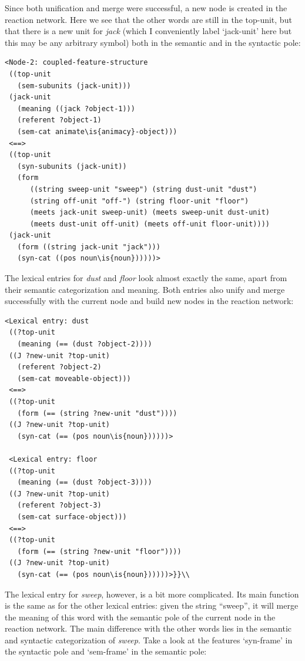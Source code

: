 Since both unification and merge were successful, a new node is created in the reaction network. Here we see that the other words are still in the top-unit, but that there is a new unit for {\em jack} (which I conveniently label `jack-unit' here but this may be any arbitrary symbol) both in the semantic and in the syntactic pole:

\ea
\begin{lstlisting}
<Node-2: coupled-feature-structure
 ((top-unit
   (sem-subunits (jack-unit)))
 (jack-unit
   (meaning ((jack ?object-1)))
   (referent ?object-1)
   (sem-cat animate\is{animacy}-object)))
 <==>
 ((top-unit
   (syn-subunits (jack-unit))
   (form 
      ((string sweep-unit "sweep") (string dust-unit "dust") 
      (string off-unit "off-") (string floor-unit "floor") 
      (meets jack-unit sweep-unit) (meets sweep-unit dust-unit) 
      (meets dust-unit off-unit) (meets off-unit floor-unit))))
 (jack-unit
   (form ((string jack-unit "jack")))
   (syn-cat ((pos noun\is{noun})))))> 
\end{lstlisting}
\z

\largerpage
The lexical entries for {\em dust} and {\em floor} look almost exactly the same, apart from their semantic categorization and meaning. Both entries also unify and merge successfully with the current node and build new nodes in the reaction network: 

\ea
\begin{lstlisting}
<Lexical entry: dust
 ((?top-unit
   (meaning (== (dust ?object-2))))
 ((J ?new-unit ?top-unit)
   (referent ?object-2)
   (sem-cat moveable-object)))
 <==>
 ((?top-unit
   (form (== (string ?new-unit "dust"))))
 ((J ?new-unit ?top-unit)
   (syn-cat (== (pos noun\is{noun})))))> 
 
 <Lexical entry: floor
 ((?top-unit
   (meaning (== (dust ?object-3))))
 ((J ?new-unit ?top-unit)
   (referent ?object-3)
   (sem-cat surface-object)))
 <==>
 ((?top-unit
   (form (== (string ?new-unit "floor"))))
 ((J ?new-unit ?top-unit)
   (syn-cat (== (pos noun\is{noun})))))>}}\\
\end{lstlisting}
\z


The lexical entry for {\em sweep}, however, is a bit more complicated. Its main function is the same as for the other lexical entries: given the string ``sweep'', it will merge the meaning of this word with the semantic pole of the current node in the reaction network. The main difference with the other words lies in the semantic and syntactic categorization of {\em sweep}. Take a look at the features `syn-frame' in the syntactic pole and `sem-frame' in the semantic pole:


